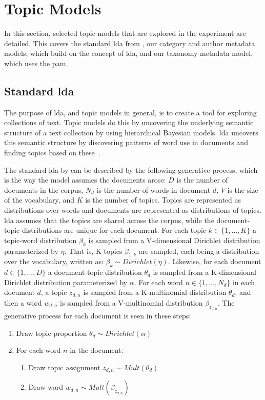 \section{Topic Models}\label{sec:plate_notation}
In this section, selected topic models that are explored in the experiment are detailed.
This covers the standard \gls{lda} from \citet{blei2003latent}, our category and author metadata models, which build on the concept of \gls{lda}, and our taxonomy metadata model, which uses the \acrlong{pam}.

\subsection{Standard \gls{lda}}
The purpose of \gls{lda}, and topic models in general, is to create a tool for exploring collections of text.
Topic models do this by uncovering the underlying semantic structure of a text collection by using hierarchical Bayesian models.
\Gls{lda} uncovers this semantic structure by discovering patterns of word use in documents and finding topics based on these~\cite{blei2009topic}.

The standard \gls{lda} by \citet{blei2003latent} can be described by the following generative process, which is the way the model assumes the documents arose:
$D$ is the number of documents in the corpus, $N_d$ is the number of words in document $d$, $V$ is the size of the vocabulary, and $K$ is the number of topics.
Topics are represented as distributions over words and documents are represented as distributions of topics.
\Gls{lda} assumes that the topics are shared across the corpus, while the document-topic distributions are unique for each document.
For each topic $k \in \{1,\dots, K\}$ a topic-word distribution $\beta_k$ is sampled from a V-dimensional Dirichlet distribution parameterized by $\eta$.
That is, K topics $\beta_{1:k}$ are sampled, each being a distribution over the vocabulary, written as: $\beta_k \sim Dirichlet(\eta)$.
Likewise, for each document $d \in \{1,\dots, D\}$ a document-topic distribution $\theta_d$ is sampled from a K-dimensional Dirichlet distribution parameterized by $\alpha$.
For each word $n \in \{1, \dots, N_d\}$ in each document $d$, a topic $z_{d,n}$ is sampled from a K-multinomial distribution $\theta_d$, and then a word $w_{d,n}$ is sampled from a V-multinomial distribution $\beta_{z_{d,n}}$.
The generative process for each document is seen in these steps:

\vspace{\topsep}
\begin{enumerate}
	\item Draw topic proportion $\theta_d \sim Dirichlet(\alpha)$
	\item For each word $n$ in the document:
	\begin{enumerate}
		\item Draw topic assignment $z_{d,n} \sim Mult(\theta_d)$
		\item Draw word $w_{d,n} \sim Mult(\beta_{z_{d,n}})$
	\end{enumerate}
\end{enumerate}
\vspace{\topsep}

